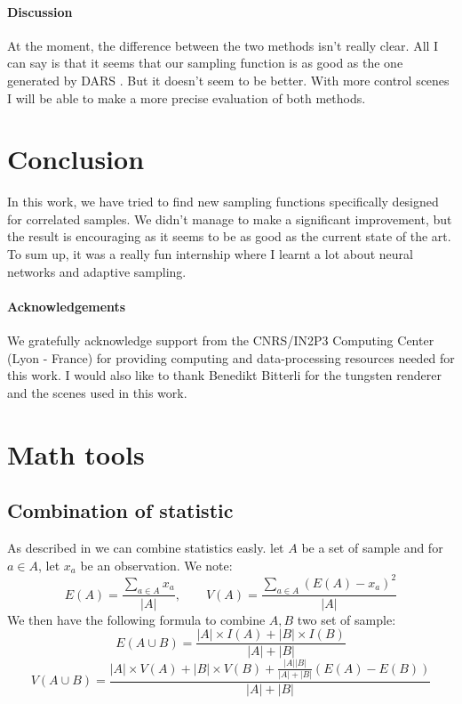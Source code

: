 \documentclass{classeENS}
\begin{document}
\paragraph*{Discussion} At the moment, the difference between the two methods 
isn't really clear. All I can say is that it seems that our sampling function 
is as good as the one generated by DARS \cite{kuznetsov2018deep}. But it doesn't 
seem to be better. With more control scenes I will be able to make a more precise 
evaluation of both methods.

\section{Conclusion}

In this work, we have tried to find new sampling functions specifically designed 
for correlated samples. We didn't manage to make a significant improvement, but 
the result is encouraging as it seems to be as good as the current state of the 
art. To sum up, it was a really fun internship where I learnt a lot about neural 
networks and adaptive sampling.

\paragraph*{Acknowledgements} We gratefully acknowledge support from the 
CNRS/IN2P3 Computing Center (Lyon - France) for providing computing and 
data-processing resources needed for this work. I would also like to thank 
Benedikt Bitterli for the tungsten renderer and the scenes used in this work.

\printbibliography

\appendix

\section{Math tools}

\subsection{Combination of statistic} \label{combi}
As described in \cite{Chan1983AlgorithmsFC} we can combine statistics easly.
let $A$ be a set of sample and for $a\in A$, let $x_a$ be an observation. We note: 
\[E(A) = \frac{\sum_{a\in A} x_a}{|A|}, \qquad V(A) = \frac{\sum_{a\in A} (E(A) - x_a)^2}{|A|}\]
We then have the following formula to combine $A, B$ two set of sample:
\[E(A\cup B) = \frac{|A|\times I(A) + |B|\times I(B)}{|A|+|B|}\]
\[V(A\cup B) = \frac{ |A|\times V(A) + |B|\times V(B) + 
        \frac{|A||B|}{|A| + |B|}\left(E(A) - E(B)\right)}{|A| + |B|}\]
\end{document}

